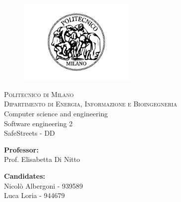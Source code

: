 


  \begin{titlepage}
    \begin{figure}[t]
        \centering\includegraphics[width=0.5\textwidth]{Images/logo_polimi}
    \end{figure}
    \begin{center}
        \textsc{ \LARGE{Politecnico di Milano \\}}
      \textsc{ \LARGE{Dipartimento di Energia, Informazione e Bioingegneria\\ }}
      \textnormal{ \LARGE{Computer science and engineering \\ Software engineering 2\\}}
      \vspace{30mm}
      \fontsize{10mm}{7mm}\selectfont 
        \textup{SafeStreets - DD}\\
    \end{center}
    
    \vspace{25mm}
    
    \begin{minipage}[t]{0.47\textwidth}
      \textnormal{\large{\bf Professor:\\}}
      {\large Prof. Elisabetta Di Nitto}
    \end{minipage}\hfill\begin{minipage}[t]{0.47\textwidth}\raggedleft
      \textnormal{\large{\bf Candidates:\\}}
      {\large Nicolò Albergoni - 939589\\}
      {\large Luca Loria - 944679}
    \end{minipage}
    
    \vspace{20mm}
    
    
  \end{titlepage}
  
